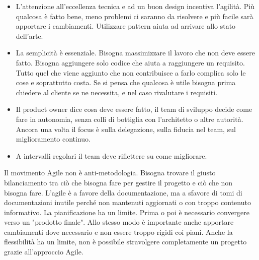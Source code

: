 \begin{itemize}
	\item L'attenzione all'eccellenza tecnica e ad un buon design incentiva l'agilità. Più qualcosa è fatto bene, meno problemi ci saranno da risolvere e più facile sarà apportare i cambiamenti. Utilizzare pattern aiuta ad arrivare allo stato dell'arte.
	\item La semplicità è essenziale. Bisogna massimizzare il lavoro che non deve essere fatto. Bisogna aggiungere solo codice che aiuta a raggiungere un requisito. Tutto quel che viene aggiunto che non contribuisce a farlo complica solo le cose e soprattutto costa. Se si pensa che qualcosa è utile bisogna prima chiedere al cliente se ne necessita, e nel caso rivalutare i requisiti.
	\item Il product owner dice cosa deve essere fatto, il team di sviluppo decide come fare in autonomia, senza colli di bottiglia con l'architetto o altre autorità. Ancora una volta il focus è sulla delegazione, sulla fiducia nel team, sul miglioramento continuo.
	\item A intervalli regolari il team deve riflettere su come migliorare.
\end{itemize}
Il movimento Agile non è anti-metodologia. Bisogna trovare il giusto bilanciamento tra ciò che bisogna fare per gestire il progetto e ciò che non bisogna fare.
L'agile è a favore della documentazione, ma a sfavore di tomi di documentazioni inutile perché non mantenuti aggiornati o con troppo contenuto informativo.\newline
La pianificazione ha un limite. Prima o poi è necessario convergere verso un "prodotto finale". Allo stesso modo è importante anche apportare cambiamenti dove necessario e non essere troppo rigidi coi piani. Anche la flessibilità ha un limite, non è possibile stravolgere completamente un progetto grazie all'approccio Agile.
